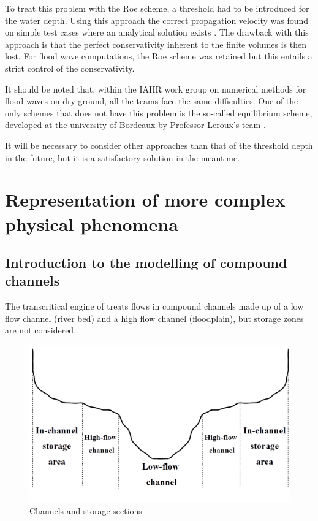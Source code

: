 To treat this problem with the Roe scheme, a threshold had to be introduced for the water depth. Using this approach the correct propagation velocity was found on simple test cases where an analytical solution exists \cite{GOUTAL97}. The drawback with this approach is that the perfect conservativity inherent to the finite volumes is then lost. For flood wave computations, the Roe scheme was retained but this entails a strict control of the conservativity.

It should be noted that, within the IAHR work group on numerical methods for flood waves on dry ground, all the teams face the same difficulties.
One of the only schemes that does not have this problem is the so-called equilibrium scheme, developed at the university of Bordeaux by Professor Leroux's team \cite{LECOZ96}\cite{BON97}.

It will be necessary to consider other approaches than that of the threshold depth in the future, but it is a satisfactory solution in the meantime.

\section{Representation of more complex physical phenomena}
\label{ModelCplx}

\subsection{Introduction to the modelling of compound channels}

The transcritical engine of \mascaret{} treats flows in compound channels made up of a low flow channel (river bed) and a high flow channel (floodplain), but storage zones are not considered.

\begin{figure}[H]
 \begin{center}
  \includegraphics[width=\textwidth]{Figures/Lits.png}
  \caption{Channels and storage sections}
 \end{center}
\end{figure}

